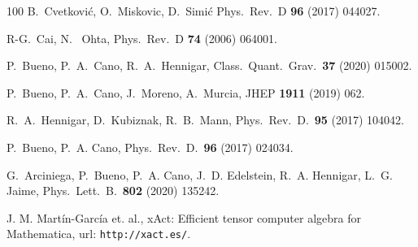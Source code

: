 \documentclass[aps,prd,preprint,nofootinbib]{revtex4-1}
\begin{document}
\begin{thebibliography}{100}
 B.~Cvetković, O.~Miskovic, D.~Simić  	
Phys.\ Rev.\ D {\bf 96} (2017) 044027.

 R-G.~Cai, N.~ Ohta, 
	Phys.\ Rev.\ D {\bf 74} (2006) 064001.

 P.~Bueno, P.~A.~Cano, R.~A.~Hennigar,
  Class.\ Quant.\ Grav.\  {\bf 37} (2020) 015002.

 P.~Bueno, P.~A.~Cano, J.~Moreno, A.~Murcia,
 JHEP  {\bf 1911} (2019) 062.

 R.~A.~Hennigar, D.~Kubiznak, R.~B.~Mann,
 Phys.\ Rev.\ D.\ {\bf 95} (2017) 104042.

 P.~Bueno, P.~A. Cano,
Phys.\ Rev.\ D.\ {\bf 96} (2017) 024034.

 G.~Arciniega, P.~Bueno, P.~A. Cano, J.~D. Edelstein, R.~A. Hennigar, L.~G. Jaime,
Phys.\ Lett.\ B.\ {\bf 802} (2020) 135242.

 J. M. Mart\'in-Garc\'ia et. al.,
xAct: Efficient tensor computer algebra for Mathematica,
url: \texttt{http://xact.es/}.

\end{thebibliography}

\newpage{\pagestyle{empty}\cleardoublepage}

  
\end{document}
